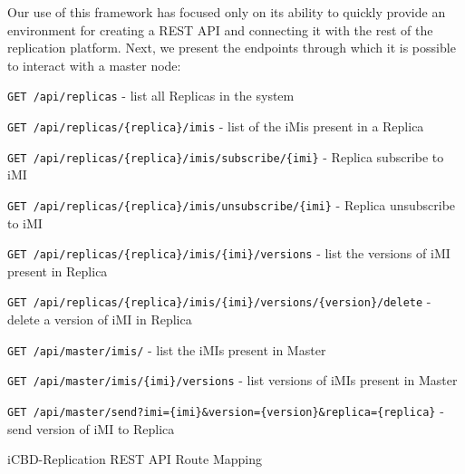 Our use of this framework has focused only on its ability to quickly provide an environment for creating a REST API and connecting it with the rest of the replication platform. 
Next, we present the endpoints through which it is possible to interact with a master node:

\begin{listing}[ht]
\begin{description}
	\item \texttt{GET /api/replicas} - list all Replicas in the system
	\item \texttt{GET /api/replicas/\{replica\}/imis} - list of the iMis present in a Replica 
	\item \texttt{GET /api/replicas/\{replica\}/imis/subscribe/\{imi\}} - Replica subscribe to iMI 
	\item \texttt{GET /api/replicas/\{replica\}/imis/unsubscribe/\{imi\}} - Replica unsubscribe to iMI 
	\item \texttt{GET /api/replicas/\{replica\}/imis/\{imi\}/versions} - list the versions of iMI present in Replica
	\item \texttt{GET /api/replicas/\{replica\}/imis/\{imi\}/versions/\{version\}/delete} - delete a version of iMI in Replica
	\item \texttt{GET /api/master/imis/} - list the iMIs present in Master
	\item \texttt{GET /api/master/imis/\{imi\}/versions} - list versions of iMIs present in Master
	\item \texttt{GET /api/master/send?imi=\{imi\}\&version=\{version\}\&replica=\{replica\}} - send version of iMI to Replica
\end{description}
\caption{iCBD-Replication REST API Route Mapping}
\label{listing:impl_restapi}
\end{listing}




